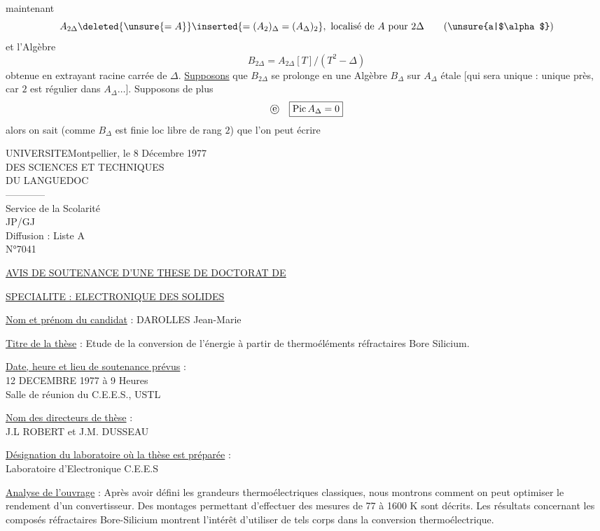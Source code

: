  maintenant 
\[
 A_{2\Delta}\deleted{\unsure{=A}}\inserted{=(A_2)_\Delta=(A_\Delta)_2},\ \text{localisé de $A$ pour $2\Delta$} \tag*{(\unsure{a|$\alpha$})}
\]
et l'Algèbre
\[
 B_{2\Delta}=A_{2\Delta}[T]/(T^2-\Delta)
\]
obtenue en extrayant  racine carrée de $\Delta$.  \uline{Supposons} que $B_{2\Delta}$ se prolonge en une Algèbre $B_\Delta$ sur $A_\Delta$  étale  [qui sera unique :  unique près, car $2$ est régulier dans $A_\Delta\ldots$]. Supposons de plus 
\[
 \text{\textcircled{e}}\quad \boxed{\operatorname{Pic} A_\Delta=0}
\]
alors on sait (comme $B_\Delta$ est finie loc libre de rang $2$) que l'on peut écrire

UNIVERSITE\hfill Montpellier, le 8 Décembre 1977\\
DES SCIENCES ET TECHNIQUES\\
DU LANGUEDOC\\
------------\\
Service de la Scolarité\\
JP/GJ\\
Diffusion : Liste A\\
N°7041

\uline{AVIS DE SOUTENANCE D'UNE THESE DE DOCTORAT DE}

\uline{SPECIALITE : ELECTRONIQUE DES SOLIDES}

\uline{Nom et prénom du candidat} : DAROLLES Jean-Marie

\uline{Titre de la thèse} : Etude de la conversion de l'énergie à partir de thermoéléments réfractaires Bore Silicium.

\uline{Date, heure et lieu de soutenance prévus} :\\
12 DECEMBRE 1977 à 9 Heures\\
Salle de réunion du C.E.E.S., USTL

\uline{Nom des directeurs de thèse} :\\
J.L ROBERT et J.M. DUSSEAU

\uline{Désignation du laboratoire où la thèse est préparée} :\\
Laboratoire d'Electronique C.E.E.S

\uline{Analyse de l'ouvrage} : Après avoir défini les grandeurs thermoélectriques classiques, nous montrons comment on peut optimiser le rendement d'un convertisseur. Des montages permettant d'effectuer des mesures de 77 à 1600 K sont décrits. Les résultats concernant les composés réfractaires Bore-Silicium montrent l'intérêt d'utiliser de tels corps dans la conversion thermoélectrique.

